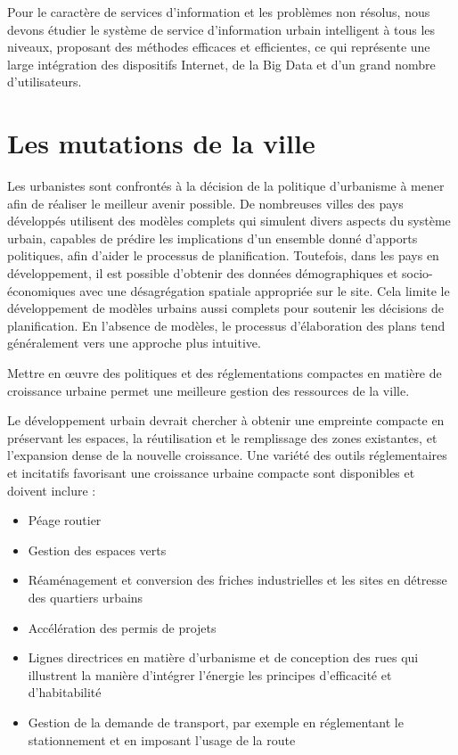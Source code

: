 Pour le caractère de services d'information et les problèmes non résolus,
nous devons étudier le système de service d'information urbain intelligent à tous les niveaux,
proposant des méthodes efficaces et efficientes, ce qui représente une large intégration des
dispositifs Internet, de la Big Data et d'un grand nombre d'utilisateurs.

\section{Les mutations de la ville}

Les urbanistes sont confrontés à la décision de la politique d'urbanisme à mener afin de réaliser le meilleur avenir possible.
De nombreuses villes des pays développés utilisent des modèles complets qui simulent divers aspects du système urbain,
capables de prédire les implications d'un ensemble donné d'apports politiques, afin d'aider le processus de planification.
Toutefois, dans les pays en développement, il est possible d'obtenir des données démographiques et socio-économiques
avec une désagrégation spatiale appropriée sur le site.
Cela limite le développement de modèles urbains aussi complets pour soutenir les décisions de planification.
En l'absence de modèles, le processus d'élaboration des plans tend généralement vers une approche plus intuitive.

Mettre en œuvre des politiques et des réglementations compactes en matière de croissance urbaine
permet une meilleure gestion des ressources de la ville.

Le développement urbain devrait chercher à obtenir une empreinte compacte en préservant les
espaces, la réutilisation et le remplissage des zones existantes, et l'expansion dense de la nouvelle croissance.
Une variété des outils réglementaires et incitatifs favorisant une croissance urbaine compacte sont disponibles
et doivent inclure :

\begin{itemize}
    \item Péage routier
    \item Gestion des espaces verts
    \item Réaménagement et conversion des friches industrielles et les sites en détresse des quartiers urbains
    \item Accélération des permis de projets
    \item Lignes directrices en matière d'urbanisme et de conception des rues qui illustrent la manière d'intégrer l'énergie
    les principes d'efficacité et d'habitabilité
    \item Gestion de la demande de transport, par exemple en réglementant le stationnement et en imposant l'usage de la route
\end{itemize}

